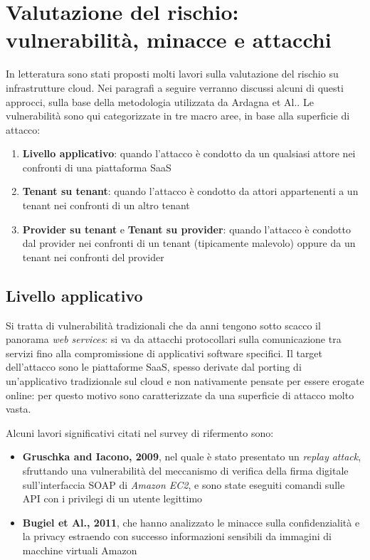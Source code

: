\documentclass[../main.tex]{subfiles}
\begin{document}
\section{Valutazione del rischio: vulnerabilità, minacce e attacchi}
In letteratura sono stati proposti molti lavori sulla valutazione del rischio su infrastrutture cloud. Nei paragrafi a seguire verranno discussi alcuni di questi approcci, sulla base della metodologia utilizzata da Ardagna et Al.\cite{Ardagna:2015:SAC:2808687.2767005}.
Le vulnerabilità sono qui categorizzate in tre macro aree, in base alla superficie di attacco:
\begin{enumerate}
    \item \textbf{Livello applicativo}: quando l'attacco è condotto da un qualsiasi attore nei confronti di una piattaforma SaaS
    \item \textbf{Tenant su tenant}: quando l'attacco è condotto da attori appartenenti a un tenant nei confronti di un altro tenant
    \item \textbf{Provider su tenant} e \textbf{Tenant su provider}: quando l'attacco è condotto dal provider nei confronti di un tenant (tipicamente malevolo) oppure da un tenant nei confronti del provider 
\end{enumerate}
\subsection{Livello applicativo}
Si tratta di vulnerabilità tradizionali che da anni tengono sotto scacco il panorama \textit{web services}: si va da attacchi protocollari sulla comunicazione tra servizi fino alla compromissione di applicativi software specifici. Il target dell'attacco sono le piattaforme SaaS, spesso derivate dal porting di un'applicativo tradizionale sul cloud e non nativamente pensate per essere erogate online: per questo motivo sono caratterizzate da una superficie di attacco molto vasta.

Alcuni lavori significativi citati nel survey di rifermento \cite{Ardagna:2015:SAC:2808687.2767005} sono:
\begin{itemize}
    \item \textbf{Gruschka and Iacono, 2009}\cite{}, nel quale è stato presentato un \textit{replay attack}, sfruttando una vulnerabilità del meccanismo di verifica della firma digitale sull'interfaccia SOAP di \textit{Amazon EC2}, e sono state eseguiti comandi sulle API con i privilegi di un utente legittimo
    \item \textbf{Bugiel et Al., 2011}\cite{}, che hanno analizzato le minacce sulla confidenzialità e la privacy estraendo con successo informazioni sensibili da immagini di macchine virtuali Amazon 
\end{itemize} %
\end{document}
